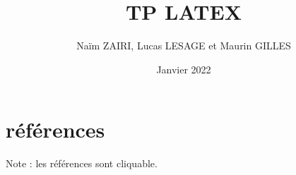\documentclass[12pt]{article}
\title{\Huge{TP LATEX}}
\author{\Large{Naïm ZAIRI, Lucas LESAGE et Maurin GILLES}}
\date{\Large{Janvier 2022}}
\begin{document}
\maketitle 

\tableofcontents






\newpage







\newpage







\newpage
\part*{références}
%

Note : les références sont cliquable.
\end{document}
